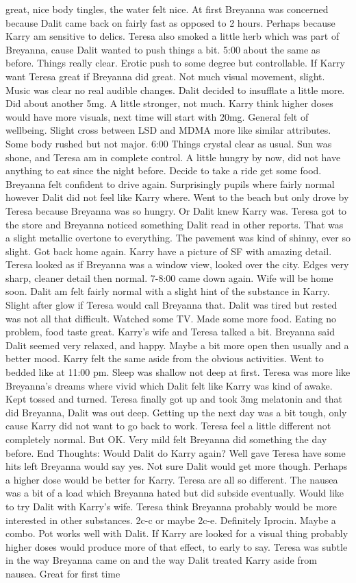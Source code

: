 \documentclass[12pt]{book}
\begin{document}
great, nice body tingles, the water felt nice. At first Breyanna was concerned because Dalit came back on fairly fast as opposed to 2 hours. Perhaps because Karry am sensitive to delics. Teresa also smoked a little herb which was part of Breyanna, cause Dalit wanted to push things a bit. 5:00 about the same as before. Things really clear. Erotic push to some degree but controllable. If Karry want Teresa great if Breyanna did great. Not much visual movement, slight. Music was clear no real audible changes. Dalit decided to insufflate a little more. Did about another 5mg. A little stronger, not much. Karry think higher doses would have more visuals, next time will start with 20mg. General felt of wellbeing. Slight cross between LSD and MDMA more like similar attributes. Some body rushed but not major. 6:00 Things crystal clear as usual. Sun was shone, and Teresa am in complete control. A little hungry by now, did not have anything to eat since the night before. Decide to take a ride get some food. Breyanna felt confident to drive again. Surprisingly pupils where fairly normal however Dalit did not feel like Karry where. Went to the beach but only drove by Teresa because Breyanna was so hungry. Or Dalit knew Karry was. Teresa got to the store and Breyanna noticed something Dalit read in other reports. That was a slight metallic overtone to everything. The pavement was kind of shinny, ever so slight. Got back home again. Karry have a picture of SF with amazing detail. Teresa looked as if Breyanna was a window view, looked over the city. Edges very sharp, cleaner detail then normal. 7-8:00 came down again. Wife will be home soon. Dalit am felt fairly normal with a slight hint of the substance in Karry. Slight after glow if Teresa would call Breyanna that. Dalit was tired but rested was not all that difficult. Watched some TV. Made some more food. Eating no problem, food taste great. Karry's wife and Teresa talked a bit. Breyanna said Dalit seemed very relaxed, and happy. Maybe a bit more open then usually and a better mood. Karry felt the same aside from the obvious activities. Went to bedded like at 11:00 pm. Sleep was shallow not deep at first. Teresa was more like Breyanna's dreams where vivid which Dalit felt like Karry was kind of awake. Kept tossed and turned. Teresa finally got up and took 3mg melatonin and that did Breyanna, Dalit was out deep. Getting up the next day was a bit tough, only cause Karry did not want to go back to work. Teresa feel a little different not completely normal. But OK. Very mild felt Breyanna did something the day before. End Thoughts: Would Dalit do Karry again? Well gave Teresa have some hits left Breyanna would say yes. Not sure Dalit would get more though. Perhaps a higher dose would be better for Karry. Teresa are all so different. The nausea was a bit of a load which Breyanna hated but did subside eventually. Would like to try Dalit with Karry's wife. Teresa think Breyanna probably would be more interested in other substances. 2c-c or maybe 2c-e. Definitely Iprocin. Maybe a combo. Pot works well with Dalit. If Karry are looked for a visual thing probably higher doses would produce more of that effect, to early to say. Teresa was subtle in the way Breyanna came on and the way Dalit treated Karry aside from nausea. Great for first time 
\end{document}
